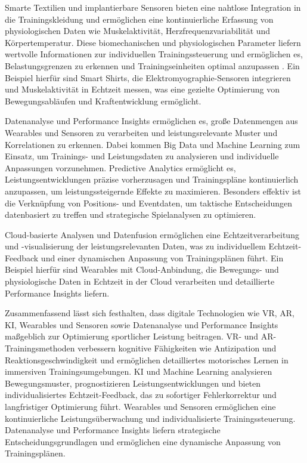 \documentclass[
  number]{elsarticle}
\begin{document}
Smarte Textilien und implantierbare Sensoren bieten eine nahtlose
Integration in die Trainingskleidung und ermöglichen eine
kontinuierliche Erfassung von physiologischen Daten wie Muskelaktivität,
Herzfrequenzvariabilität und Körpertemperatur. Diese biomechanischen und
physiologischen Parameter liefern wertvolle Informationen zur
individuellen Trainingssteuerung und ermöglichen es, Belastungsgrenzen
zu erkennen und Trainingseinheiten optimal anzupassen
\citep[pp.~29-34]{memmert_sporttechnologie}. Ein Beispiel hierfür sind
Smart Shirts, die Elektromyographie-Sensoren integrieren und
Muskelaktivität in Echtzeit messen, was eine gezielte Optimierung von
Bewegungsabläufen und Kraftentwicklung ermöglicht.
\citep[pp.~435-447]{wearables_Käferböck}

Datenanalyse und Performance Insights ermöglichen es, große Datenmengen
aus Wearables und Sensoren zu verarbeiten und leistungsrelevante Muster
und Korrelationen zu erkennen. Dabei kommen Big Data und Machine
Learning zum Einsatz, um Trainings- und Leistungsdaten zu analysieren
und individuelle Anpassungen vorzunehmen. Predictive Analytics
ermöglicht es, Leistungsentwicklungen präzise vorherzusagen und
Trainingspläne kontinuierlich anzupassen, um leistungssteigernde Effekte
zu maximieren. Besonders effektiv ist die Verknüpfung von Positions- und
Eventdaten, um taktische Entscheidungen datenbasiert zu treffen und
strategische Spielanalysen zu optimieren.
\citep[pp.74-79]{memmert_sportinformatik}

Cloud-basierte Analysen und Datenfusion ermöglichen eine
Echtzeitverarbeitung und -visualisierung der leistungsrelevanten Daten,
was zu individuellem Echtzeit-Feedback und einer dynamischen Anpassung
von Trainingsplänen führt. Ein Beispiel hierfür sind Wearables mit
Cloud-Anbindung, die Bewegungs- und physiologische Daten in Echtzeit in
der Cloud verarbeiten und detaillierte Performance Insights liefern.
\citep[pp.~435-447]{wearables_Käferböck}

Zusammenfassend lässt sich festhalten, dass digitale Technologien wie
VR, AR, KI, Wearables und Sensoren sowie Datenanalyse und Performance
Insights maßgeblich zur Optimierung sportlicher Leistung beitragen. VR-
und AR-Trainingsmethoden verbessern kognitive Fähigkeiten wie
Antizipation und Reaktionsgeschwindigkeit und ermöglichen detailliertes
motorisches Lernen in immersiven Trainingsumgebungen. KI und Machine
Learning analysieren Bewegungsmuster, prognostizieren
Leistungsentwicklungen und bieten individualisiertes Echtzeit-Feedback,
das zu sofortiger Fehlerkorrektur und langfristiger Optimierung führt.
Wearables und Sensoren ermöglichen eine kontinuierliche
Leistungsüberwachung und individualisierte Trainingssteuerung.
Datenanalyse und Performance Insights liefern strategische
Entscheidungsgrundlagen und ermöglichen eine dynamische Anpassung von
Trainingsplänen.
\end{document}
